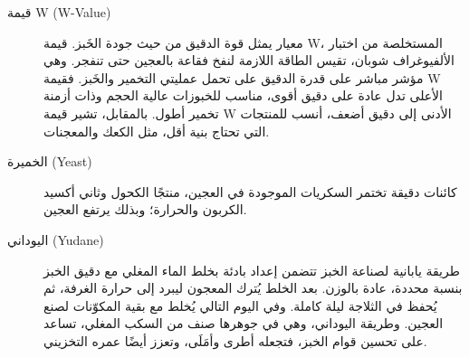 \begin{description}
\item[قيمة \textenglish{W} \textenglish{(W-Value)}]
معيار يمثل قوة الدقيق من حيث جودة الخَبز. قيمة \textenglish{W}، المستخلصة من اختبار الألفيوغراف شوبان، تقيس الطاقة اللازمة لنفخ فقاعة بالعجين حتى تنفجر. وهي مؤشر مباشر على قدرة الدقيق على تحمل عمليتي التخمير والخَبز. فقيمة \textenglish{W} الأعلى تدل عادة على دقيق أقوى، مناسب للخبوزات عالية الحجم وذات أزمنة تخمير أطول. بالمقابل، تشير قيمة \textenglish{W} الأدنى إلى دقيق أضعف، أنسب للمنتجات التي تحتاج بنية أقل، مثل الكعك والمعجنات.

\item[الخميرة \textenglish{(Yeast)}]
كائنات دقيقة تختمر السكريات الموجودة في العجين، منتجًا الكحول وثاني أكسيد الكربون والحرارة؛ وبذلك يرتفع العجين.

\item[اليوداني \textenglish{(Yudane)}]
طريقة يابانية لصناعة الخبز تتضمن إعداد بادئة بخلط الماء المغلي مع دقيق الخبز بنسبة محددة، عادة  بالوزن. بعد الخلط يُترك المعجون ليبرد إلى حرارة الغرفة، ثم يُحفظ في الثلاجة ليلة كاملة. وفي اليوم التالي يُخلط مع بقية المكوّنات لصنع العجين. وطريقة اليوداني، وهي في جوهرها صنف من السكب المغلي، تساعد على تحسين قوام الخبز، فتجعله أطرى وأمَلَى، وتعزز أيضًا عمره التخزيني.

\end{description}
